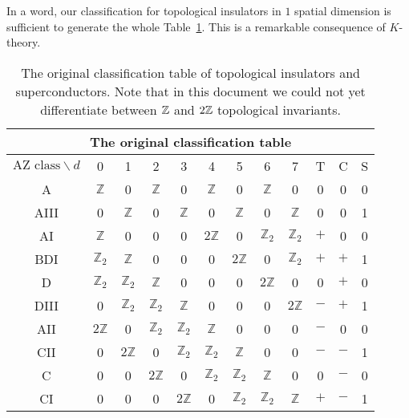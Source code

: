 \documentclass{article}
\begin{document}
In a word, our classification for topological insulators in $1$ spatial
dimension is sufficient to generate the whole Table~\ref{tab:master-table2}.
This is a remarkable consequence of $K$-theory.
\begin{table}
\begin{center}
\begin{tabular}{|c|cccccccc|ccc|}
\hline
\multicolumn{12}{|c|}{
The original classification table} \\ \hline
   $\mbox{AZ class} \backslash d$  & 0 & 1 & 2 & 3 & 4 & 5 & 6 & 7 & T & C & S  \\
\hline\hline
  A & $\mathbb{Z}$ & 0 & $\mathbb{Z}$ & 0 & $\mathbb{Z}$ & 0 & $\mathbb{Z}$ & 0             & 0 & 0 & 0    \\
  AIII & 0 & $\mathbb{Z}$ & 0 & $\mathbb{Z}$ & 0 & $\mathbb{Z}$ & 0 & $\mathbb{Z}$          & 0 & 0 & 1    \\  \hline

  AI & $\mathbb{Z}$ & 0 & 0 & 0 & $2\mathbb{Z}$ & 0 & $\mathbb{Z}_2$ & $\mathbb{Z}_2$    & $+$ & 0 & 0     \\
  BDI & $\mathbb{Z}_2$ & $\mathbb{Z}$ & 0 & 0 & 0 & $2\mathbb{Z}$ & 0 & $\mathbb{Z}_2$     & $+$ & $+$ & 1    \\
  D & $\mathbb{Z}_2$ & $\mathbb{Z}_2$ & $\mathbb{Z}$ & 0 & 0 & 0 & $2\mathbb{Z}$ & 0     & 0 & $+$ & 0     \\
  DIII & 0 & $\mathbb{Z}_2$ & $\mathbb{Z}_2$ & $\mathbb{Z}$ & 0 & 0 & 0 & $2\mathbb{Z}$  & $-$ & $+$ & 1     \\
  AII & $2\mathbb{Z}$ & 0 & $\mathbb{Z}_2$ & $\mathbb{Z}_2$ & $\mathbb{Z}$ & 0 & 0 & 0   & $-$ & 0 & 0     \\
  CII & 0 & $2\mathbb{Z}$ & 0 & $\mathbb{Z}_2$ & $\mathbb{Z}_2$ & $\mathbb{Z}$ & 0 & 0   & $-$ & $-$ & 1     \\
  C & 0 & 0 & $2\mathbb{Z}$ & 0 & $\mathbb{Z}_2$ & $\mathbb{Z}_2$ & $\mathbb{Z}$ & 0     & 0 & $-$ & 0     \\
  CI & 0 & 0 & 0 & $2\mathbb{Z}$ & 0 & $\mathbb{Z}_2$ & $\mathbb{Z}_2$ & $\mathbb{Z}$    & $+$ & $-$ & 1
   \\
\hline
\end{tabular}
\caption{The original classification table of topological insulators and
superconductors. Note that in this document we could not yet differentiate
between $\mathbb{Z}$ and $2\mathbb{Z}$ topological invariants.}
\label{tab:master-table2}
\end{center}
\end{table}
\end{document}
